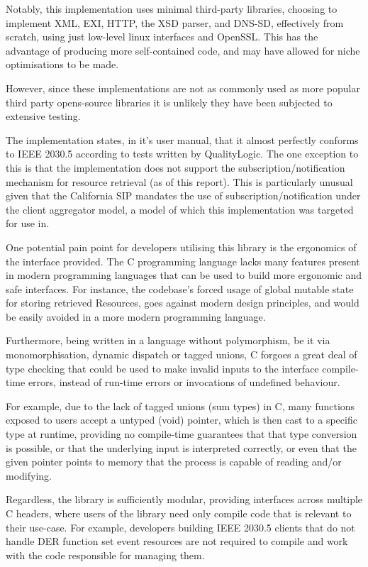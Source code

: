 Notably, this implementation uses minimal third-party libraries, choosing to implement XML, EXI, HTTP, the XSD parser, and DNS-SD, effectively from scratch, using just low-level linux interfaces and OpenSSL. This has the advantage of producing more self-contained code, and may have allowed for niche optimisations to be made.

However, since these implementations are not as commonly used as more popular third party opens-source libraries it is unlikely they have been subjected to extensive testing.

The implementation states, in it's user manual, that it almost perfectly conforms to IEEE 2030.5 according to tests written by QualityLogic.
The one exception to this is that the implementation does not support the subscription/notification mechanism for resource retrieval (as of this report).
This is particularly unusual given that the California SIP mandates the use of subscription/notification under the client aggregator model, a model of which this implementation was targeted for use in.

One potential pain point for developers utilising this library is the ergonomics of the interface provided. The C programming language lacks many features present in modern programming languages that can be used to build more ergonomic and safe interfaces. For instance, the codebase's forced usage of global mutable state for storing retrieved Resources, goes against modern design principles, and would be easily avoided in a more modern programming language. 

Furthermore, being written in a language without polymorphism, be it via monomorphisation, dynamic dispatch or tagged unions, C forgoes a great deal of type checking that could be used to make invalid inputs to the interface compile-time errors, instead of run-time errors or invocations of undefined behaviour. 

For example, due to the lack of tagged unions (sum types) in C, many functions exposed to users accept a untyped (void) pointer, which is then cast to a specific type at runtime, providing no compile-time guarantees that that type conversion is possible, or that the underlying input is interpreted correctly, or even that the given pointer points to memory that the process is capable of reading and/or modifying.

Regardless, the library is sufficiently modular, providing interfaces across multiple C headers, where users of the library need only compile code that is relevant to their use-case. For example, developers building IEEE 2030.5 clients that do not handle DER function set event resources are not required to compile and work with the code responsible for managing them.


